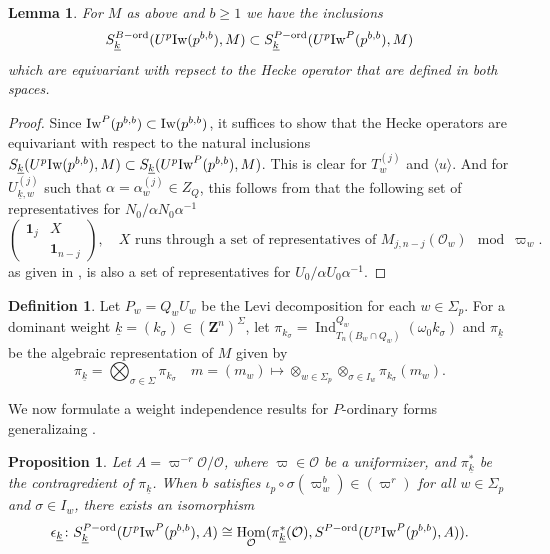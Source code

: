 \documentclass[leqno]{amsart}
\newcommand{\wt}[1]{\underline{ #1 }}
\newcommand{\Iw}{\textnormal{Iw}}
\newcommand{\ord}{\textnormal{ord}}
\newcommand{\id}{\mathbf{1}}
\newcommand{\Z}{{\mathbf{Z}}}
\newcommand{\oo}{\mathcal{O}} %
\DeclareMathOperator{\Hom}{Hom}
\DeclareMathOperator{\Ind}{Ind}
\newtheorem{lem}[thm]{Lemma}
\newtheorem{prop}[thm]{Proposition}
\theoremstyle{definition}
\newtheorem{defn}[thm]{Definition}
\theoremstyle{remark}
\begin{document}
\begin{lem}
	For $M$ as above and $b\geq 1$ we have the inclusions 
	\begin{equation*}
		S_{\wt{k}}^{B-\ord}(U^p\Iw(p^{b,b}),M)\subset
		S_{\wt{k}}^{P-\ord}(U^p\Iw^P(p^{b,b}),M)
	\end{equation*}
	which are equivariant with repsect to the 
	Hecke operator that are defined in both spaces.
\end{lem}
\begin{proof}
	Since $\Iw^P(p^{b,b})\subset \Iw(p^{b,b})$,
	it suffices to show that the Hecke operators 
	are equivariant with respect to the natural inclusions
	$S_{\wt{k}}(U^p\Iw(p^{b,b}),M)\subset S_{\wt{k}}(U^p\Iw^P(p^{b,b}),M)$.
	This is clear for $T_w^{(j)}$ and $\langle u\rangle$.
	And for  $U_{\wt{k},w}^{(j)}$ such that 
	$\alpha=\alpha_w^{(j)}\in Z_Q$, this follows from that 
	the following set of representatives for $N_0/\alpha N_0\alpha^{-1}$
	\[
	\begin{pmatrix}
		\id_j&X\\&\id_{n-j}
	\end{pmatrix},\quad
	X \text{ runs through a set of representatives of }
	M_{j,n-j}(\oo_w)\mod \varpi_w.
	\]
	as given in \cite[Lem 2.10]{ger}, is also
	a set of representatives for $U_0/\alpha U_0\alpha^{-1}$.
\end{proof}


\begin{defn}
	Let $P_w=Q_wU_w$ be the Levi decomposition  for each  $w\in \Sigma_p$.
	For a dominant weight 
	$\wt{k}=(k_\sigma)\in (\Z^n)^{\Sigma}$,
	let $\pi_{k_\sigma}=\Ind_{T_n(B_w\cap Q_w)}^{Q_w}(\omega_0 k_\sigma)$
	and $\pi_{\wt{k}}$ be the algebraic representation of $M$ given by
	\[
		\pi_{\wt{k}}=\bigotimes_{\sigma\in \Sigma}\pi_{k_\sigma}\quad
		m=(m_w)\mapsto 
		\otimes_{w\in \Sigma_p}\otimes_{\sigma\in I_w}
		\pi_{k_\sigma}(m_w).
	\]
\end{defn}

We now formulate a weight independence results 
for $P$-ordinary forms
generalizaing \cite[Prop 2.22]{ger}.

\begin{prop}
	Let $A=\varpi^{-r}\oo/\oo$,
	where $\varpi\in\oo$ be a uniformizer,
	and $\pi_{\wt{k}}^*$ be the contragredient of 
	$\pi_{\wt{k}}$.
	When $b$ satisfies
	$\iota_p\circ\sigma(\varpi_w^b)\in (\varpi^r)$
	for all  $w\in \Sigma_p$ and $\sigma\in I_w$,
	there exists an isomorphism
	\[
		\epsilon_{\wt{k}}
		\colon S_{\wt{k}}^{P-\ord}(U^p\Iw^P(p^{b,b}),A)\cong 
		\Hom_{\oo}(\pi_{\wt{k}}^*(\oo),
		S^{P-\ord}(U^p\Iw^P(p^{b,b}),A)).
	\]
\end{prop}
\end{document}
